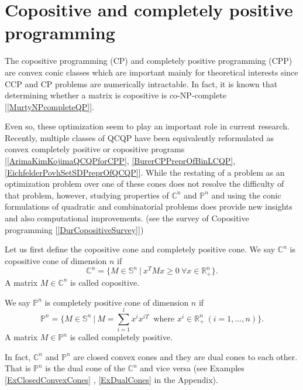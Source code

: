 \documentclass[12pt]{book}
\theoremstyle{definition}
\begin{document}
\section{Copositive and completely positive programming}


The copositive programming (CP) and completely positive programming (CPP) are convex conic classes which are important mainly for theoretical interests since CCP and CP problems are numerically intractable. 
In fact, it is known that determining whether a matrix is copositive is co-NP-complete 	[\ref{MurtyNPcompleteQP}]. 

Even so, these optimization seem to play an important role in current research. Recently, multiple classes of QCQP have been equivalently reformulated as convex completely positive or copositive programs [\ref{ArimaKimKojimaQCQPforCPP}, \ref{BurerCPPreprOfBinLCQP}, \ref{EichfelderPovhSetSDPreprOfQCQP}]. While the restating of a problem as an optimization problem over one of these cones does not resolve
the difficulty of that problem, however, studying properties of $\mathbb{C}^n$ and $\mathbb{P}^n$ and
using the conic formulations of quadratic and combinatorial problems does
provide new insights and also computational improvements. (see the survey of Copositive programming [\ref{DurCopositiveSurvey}])


Let us first define the copositive cone and completely positive cone.
\label{defCopositiveCone} We say $\mathbb{C}^n$ is copositive cone of dimension $n$ if 
\begin{equation}
\mathbb{C}^n=\{M\in \mathbb{S}^n \ | \ x^TMx\geq 0 \ \forall x\in \mathbb{R}^n_+ \}.
\end{equation}
A matrix $M \in \mathbb{C}^n$ is called copositive.


\label{defCPPcone} We say $\mathbb{P}^n$ is completely positive cone of dimension $n$ if 
\begin{equation}
\mathbb{P}^n=\{M\in \mathbb{S}^n \ | \ M = \sum_{i = 1}^l x^{i}x^{iT} \ \mbox{ where } x^i \in \mathbb{R}^n_+ \ (i = 1,\dots ,n) \}.
\end{equation}
A matrix $M\in \mathbb{P}^n$ is called completely positive.

In fact, $\mathbb{C}^n$ and $\mathbb{P}^n$ are closed convex cones and they are dual cones to each other.
That is $\mathbb{P}^n$ is the dual cone of the $\mathbb{C}^n$ and vice versa (see Examples \ref{ExClosedConvexCones} , \ref{ExDualCones} in the Appendix).
\end{document}
